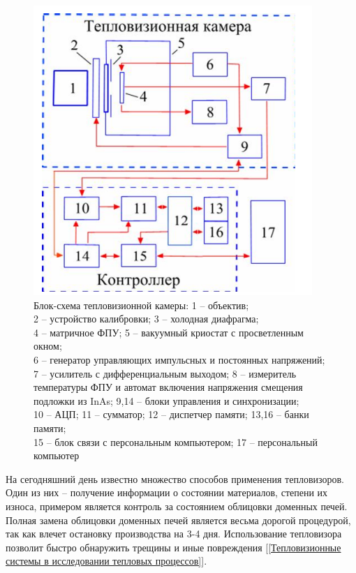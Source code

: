 \documentclass[14pt, a4paper]{extreport}
\begin{document}
	\begin{figure}[h!]
		\centering
		\includegraphics[width = \textwidth]{image/chapter_1/MatrixIRCameraScheme}	
		\caption{Блок-схема тепловизионной камеры: 1 -- объектив;\\2 -- устройство калибровки; 3 -- холодная диафрагма;\\4 -- матричное ФПУ; 5 -- вакуумный криостат с просветленным окном;\\6 -- генератор управляющих импульсных и постоянных напряжений;\\7 -- усилитель с дифференциальным выходом; 8 -- измеритель температуры ФПУ и автомат включения напряжения смещения подложки из InAs; 9,14 -- блоки управления и синхронизации;\\10 -- АЦП; 11 -- сумматор; 12 -- диспетчер памяти; 13,16 -- банки памяти;\\15 -- блок связи с персональным компьютером; 17 -- персональный компьютер}
		\label{fig:MatrixIRCameraScheme}
	\end{figure}

	На сегодняшний день известно множество способов применения тепловизоров. Один из них -- получение информации о состоянии материалов, степени их износа, примером является контроль за состоянием облицовки доменных печей. Полная замена облицовки доменных печей является весьма дорогой процедурой, так как влечет остановку производства на 3-4 дня. Использование тепловизора позволит быстро обнаружить трещины и иные повреждения [\ref{Тепловизионные системы в исследовании тепловых процессов}].
	
\end{document}
